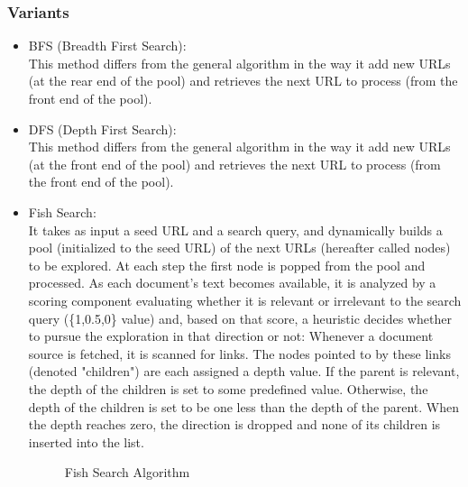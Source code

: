 \documentclass[12pt, a4paper]{report}
\begin{document}
\subsubsection{Variants}
\begin{itemize}
    \item BFS (Breadth First Search):\\
        This method differs from the general algorithm in the way it add new URLs (at the rear end of the pool) and retrieves the next URL to process (from the front end of the pool).
    \item DFS (Depth First Search):\\
        This method differs from the general algorithm in the way it add new URLs (at the front end of the pool) and retrieves the next URL to process (from the front end of the pool).
    \item Fish Search:\\
        It takes as input a seed URL and a search query, and dynamically builds a pool (initialized to the seed URL) of the next URLs (hereafter called nodes) to be explored. At each step the first node is popped from the pool and processed. As each document's text becomes available, it is analyzed by a scoring component evaluating whether it is relevant or irrelevant to the search query (\{1,0.5,0\} value) and, based on that score, a heuristic decides whether to pursue the exploration in that direction or not: Whenever a document source is fetched, it is scanned for links. The nodes pointed to by these links (denoted "children") are each assigned a depth value. If the parent is relevant, the depth of the children is set to some predefined value. Otherwise, the depth of the children is set to be one less than the depth of the parent. When the depth reaches zero, the direction is dropped and none of its children is inserted into the list.
        \begin{figure}[H]
           \begin{center}
            \caption{Fish Search Algorithm}
\label{fig:fish_search}
\end{center}
        \end{figure}
        

\end{itemize}
\end{document}
